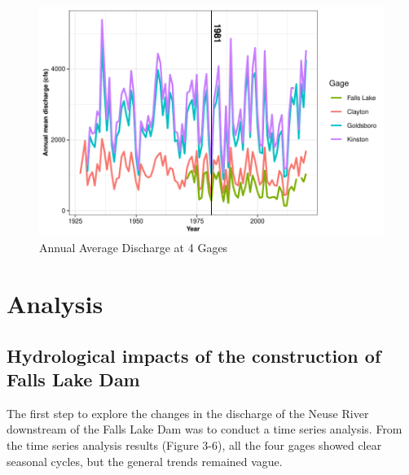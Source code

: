 \documentclass[
  12pt,
]{article}
\begin{document}
\begin{figure}

\includegraphics{Gardner_Zeng_ENV872_Project_files/figure-latex/Plot annual mean discharge-1} \hfill{}

\caption{Annual Average Discharge at 4 Gages}\label{fig:Plot annual mean discharge}
\end{figure}

\hypertarget{analysis}{%
\section{Analysis}\label{analysis}}

\hypertarget{hydrological-impacts-of-the-construction-of-falls-lake-dam}{%
\subsection{Hydrological impacts of the construction of Falls Lake
Dam}\label{hydrological-impacts-of-the-construction-of-falls-lake-dam}}

The first step to explore the changes in the discharge of the Neuse
River downstream of the Falls Lake Dam was to conduct a time series
analysis. From the time series analysis results (Figure 3-6), all the
four gages showed clear seasonal cycles, but the general trends remained
vague.
\end{document}
